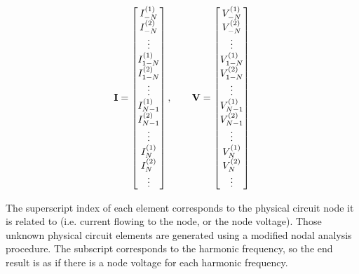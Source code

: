 \begin{equation}\label{eqn:ece1254projectReport:580}
\BI =
\begin{bmatrix}
I^{(1)}_{-N} \\
I^{(2)}_{-N} \\
\vdots \\
I^{(1)}_{1-N} \\
I^{(2)}_{1-N} \\
\vdots \\
I^{(1)}_{N-1} \\
I^{(2)}_{N-1} \\
\vdots \\
I^{(1)}_{N} \\
I^{(2)}_{N} \\
\vdots \\
\end{bmatrix},
\qquad \BV =
\begin{bmatrix}
V^{(1)}_{-N} \\
V^{(2)}_{-N} \\
\vdots \\
V^{(1)}_{1-N} \\
V^{(2)}_{1-N} \\
\vdots \\
V^{(1)}_{N-1} \\
V^{(2)}_{N-1} \\
\vdots \\
V^{(1)}_{N} \\
V^{(2)}_{N} \\
\vdots \\
\end{bmatrix}
\end{equation}

The superscript index of each element corresponds to the physical circuit node it is related to (i.e.
current flowing to the node, or the node voltage).
Those unknown physical circuit elements are generated using a modified nodal analysis procedure.
The subscript corresponds to the harmonic frequency, so the end result is as if there is a
node voltage for each harmonic frequency.

